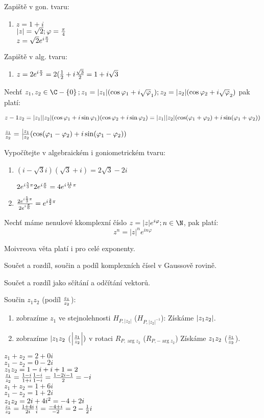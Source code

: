\Pr Zapiště v gon. tvaru:
\begin{enumerate}
	\item $z=1+i$\\
		$|z| = \sqrt 2; \varphi = \frac\pi4$\\
		$z = \sqrt 2 e^{i\frac\pi 4}$
\end{enumerate}
\Pr Zapiště v alg. tvaru:
\begin{enumerate}
	\item $z= 2e^{i\frac\pi3} = 2(\frac 12 + i \frac{\sqrt 3}2 = 1+i\sqrt 3$

\end{enumerate}

\Pr Nechť $z_1,z_2\in\C-\zs{0}; z_1 = |z_1| \* (\cos\varphi_1+i\sqrt\varphi_1);z_2 = |z_2| \* (\cos\varphi_2+i\sqrt\varphi_2)$
pak platí:

$z-1\*z_2 = |z_1|\*|z_2| \* (\cos \varphi_1+i \sin\varphi_1) \* (\cos \varphi_2+i \sin\varphi_2) = |z_1|\*|z_2| \* (\cos(\varphi_1+\varphi_2)+i\sin(\varphi_1+\varphi_2))$

$\f{z_1}{z_2} = \f{|z_1}{|z_2} \* (\cos(\varphi_1-\varphi_2)+i\sin(\varphi_1-\varphi_2))$

\Pr Vypočítejte v algebraickém i goniometrickém tvaru:
\begin{enumerate}
	\item $(i-\sqrt 3 i)(\sqrt 3+i) = 2\sqrt 3 - 2i$

		$2 e^{i\f 53 \pi} \* 2 \* e^{i\f\pi 6} = 4 e^{i\f{11}6\pi}$

	\item $\frac{2e^{i\frac53\pi}}{2e^{i\frac\pi6}} = e^{i\frac 32 \pi}$
\end{enumerate}
Nechť máme nenulové kkomplexní číslo $z = |z| e^{i\varphi}; n\in\N$, pak platí:
$$z^n = |z|^n e^{in\varphi}$$

\Poz  Moivreova věta platí i pro celé exponenty. 

\Poz  Součet a rozdíl, součin a podíl komplexních čísel v Gaussově rovině.

Součet a rozdíl jako sčítání a odčítání vektorů. 

Součin $z_1z_2$ (podíl $\frac{z_1}{z_2}$):
\begin{enumerate}
	\item zobrazíme $z_1$ ve stejnolehnosti $H_{P,|z_2|}$ ($H_{P,|z_2|^{-1}}$):
		Získáme $|z_1\*z_2|$.
	\item zobrazíme $|z_1\*z_2$ ($\left|\frac{z_1}{z_2}\right|)$ v rotaci $R_{P,\arg z_2}$ ($R_{P,-\arg z_2}$)
		Získáme $z_1\*z_2$ ($\frac{z_1}{z_2}$).
\end{enumerate}
\Pr 
{}
$z_1 + z_2  = 2 + 0 i$\\
$z_1 - z_2  = 0 - 2 i$\\
$z_1 \* z_2  = 1-i+i+1 = 2$\\
$\f{z_1}{z_2}  = \f{1-i}{1+i}\*\f{1-i}{1-i} = \f{1-2i-1}2=-i$\\
$z_1 + z_2  = 1+ 6i$\\
$z_1 - z_2  = 1+2i$\\
$z_1 \* z_2  = 2i+4i^2 = -4+2i$\\
$\f{z_1}{z_2}  = \f{1+4i}{2i}\*\f{i}{i} = \f{-4+i}{-2}=2-\f12i$\\


